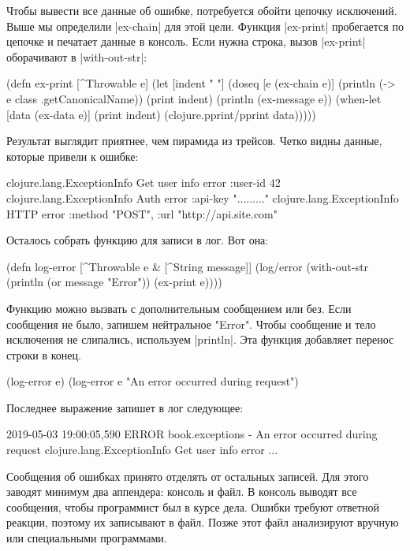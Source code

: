 Чтобы вывести все данные об ошибке, потребуется обойти цепочку исключений. Выше
мы определили \spverb|ex-chain| для этой цели. Функция \spverb|ex-print| пробегается по
цепочке и печатает данные в консоль. Если нужна строка, вызов \spverb|ex-print|
оборачивают в \spverb|with-out-str|:

\begin{code}
(defn ex-print
  [^Throwable e]
  (let [indent "  "]
    (doseq [e (ex-chain e)]
      (println (-> e class .getCanonicalName))
      (print indent)
      (println (ex-message e))
      (when-let [data (ex-data e)]
        (print indent)
        (clojure.pprint/pprint data)))))
\end{code}

Результат выглядит приятнее, чем пирамида из трейсов. Четко видны данные,
которые привели к ошибке:

\begin{code}
clojure.lang.ExceptionInfo
  Get user info error
  {:user-id 42}
clojure.lang.ExceptionInfo
  Auth error
  {:api-key "........."}
clojure.lang.ExceptionInfo
  HTTP error
  {:method "POST", :url "http://api.site.com"}
\end{code}

Осталось собрать функцию для записи в лог. Вот она:

\begin{code}
(defn log-error
  [^Throwable e & [^String message]]
  (log/error
   (with-out-str
     (println (or message "Error"))
     (ex-print e))))
\end{code}

Функцию можно вызвать с дополнительным сообщением или без. Если сообщения не
было, запишем нейтральное "Error". Чтобы сообщение и тело исключения не
слипались, используем \spverb|println|. Эта функция добавляет перенос строки в конец.

\begin{code}
(log-error e)
(log-error e "An error occurred during request")
\end{code}

Последнее выражение запишет в лог следующее:

\begin{code}
2019-05-03 19:00:05,590 ERROR book.exceptions - An error occurred during request
clojure.lang.ExceptionInfo
  Get user info error
  ...
\end{code}

Сообщения об ошибках принято отделять от остальных записей. Для этого заводят
минимум два аппендера: консоль и файл. В консоль выводят все сообщения, чтобы
программист был в курсе дела. Ошибки требуют ответной реакции, поэтому их
записывают в файл. Позже этот файл анализируют вручную или специальными
программами.

